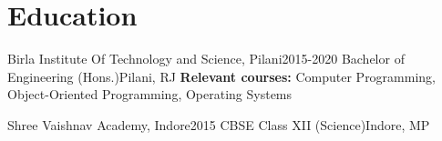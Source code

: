 \section{Education}
  \resumeSubHeadingListStart
    \resumeSubheading
      {Birla Institute Of Technology and Science, Pilani}{2015-2020}
      {Bachelor of Engineering (Hons.)}{Pilani, RJ}
      \vspace{-8pt}\resumeSubSubheading
            {\footnotesize\textnormal{\textbf{Relevant courses:} Computer Programming, Object-Oriented Programming, Operating Systems}}{}
  \resumeSubHeadingListEnd

  \vspace{-8pt}
  
  \resumeSubHeadingListStart
    \resumeSubheading
      {Shree Vaishnav Academy, Indore}{2015}
      {CBSE Class XII (Science)}{Indore, MP}
  \resumeSubHeadingListEnd
